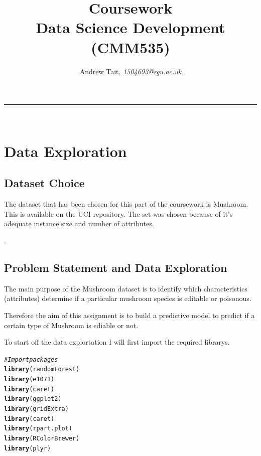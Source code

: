 \documentclass[10pt  ,usenames, dvipsnames]{article}\usepackage[]{graphicx}\usepackage[]{color}
\makeatletter
\newcommand{\hlcom}[1]{\textcolor[rgb]{0.678,0.584,0.686}{\textit{#1}}}%
\newcommand{\hlstd}[1]{\textcolor[rgb]{0.345,0.345,0.345}{#1}}%
\newcommand{\hlkwd}[1]{\textcolor[rgb]{0.737,0.353,0.396}{\textbf{#1}}}%
\newenvironment{kframe}{%
 \def\at@end@of@kframe{}%
 \ifinner\ifhmode%
  \def\at@end@of@kframe{\end{minipage}}%
  \begin{minipage}{\columnwidth}%
 \fi\fi%
 \def\FrameCommand##1{\hskip\@totalleftmargin \hskip-\fboxsep
 \colorbox{shadecolor}{##1}\hskip-\fboxsep
     \hskip-\linewidth \hskip-\@totalleftmargin \hskip\columnwidth}%
 \MakeFramed {\advance\hsize-\width
   \@totalleftmargin\z@ \linewidth\hsize
   \@setminipage}}%
 {\par\unskip\endMakeFramed%
 \at@end@of@kframe}
\newenvironment{knitrout}{}{} %
\makeatother
\begin{document}
\title{\LARGE Coursework  \\ Data Science Development (CMM535)}

\author{Andrew Tait, \textit{\href{1504693@rgu.ac.uk}{1504693@rgu.ac.uk}}}
\maketitle
\noindent\rule{16cm}{0.4pt}
\ \\



\section {Data Exploration}



\subsection{Dataset Choice}
The dataset that has been chosen for this part of the coursework is Mushroom. This is available on the UCI repository. The set was chosen because of it's adequate instance size and number of attributes.

.


\subsection{Problem Statement and Data Exploration}


The main purpose of the Mushroom dataset is to identify which characteristics (attributes) determine if a particular mushroom species is editable or poisonous.

Therefore the aim of this assignment is to build a predictive model to predict if a certain type of Mushroom is ediable or not.


To start off the data explortation I will first import the required librarys.

\begin{knitrout}
\color{fgcolor}\begin{kframe}
\begin{alltt}
\hlcom{#Import packages}
\hlkwd{library}\hlstd{(randomForest)}
\hlkwd{library}\hlstd{(e1071)}
\hlkwd{library}\hlstd{(caret)}
\hlkwd{library}\hlstd{(ggplot2)}
\hlkwd{library}\hlstd{(gridExtra)}
\hlkwd{library}\hlstd{(caret)}
\hlkwd{library}\hlstd{(rpart.plot)}
\hlkwd{library}\hlstd{(RColorBrewer)}
\hlkwd{library}\hlstd{(plyr)}
\end{alltt}
\end{kframe}
\end{knitrout}
\end{document}
